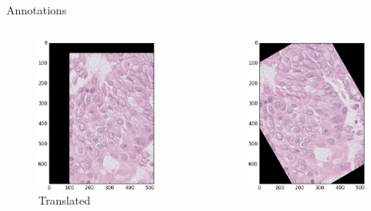 \documentclass{beamer}
\begin{document}
\begin{frame}{Annotations}
\begin{columns}[T]
\begin{column}{.16\textwidth}
\begin{figure}[!ht]
\includegraphics[width=0.9\textwidth]{shift.png}\par 
\caption{Translated}
\label{fig:shift}
\end{figure}
\end{column}%
\begin{column}{.16\textwidth}
\begin{figure}[!ht]
\centering
\includegraphics[width=0.9\textwidth]{rot.png}\par 

\end{figure}
\end{column}
\end{columns}
\end{frame}
\end{document}
